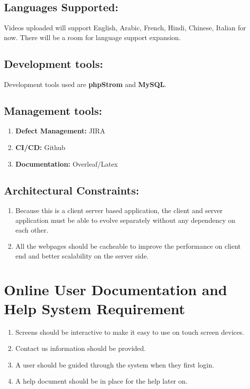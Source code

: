 \documentclass{report}
\begin{document}
\subsection{Languages Supported:}
Videos uploaded will support English, Arabic, French, Hindi, Chinese, Italian for now. There will be a room for language support expansion.
\subsection{Development tools:}
Development tools used are \textbf{phpStrom} and \textbf{MySQL}.
\subsection{Management tools:}
\begin{enumerate}
    \item \textbf{Defect Management:} JIRA
    \item \textbf{CI/CD:} Github
    \item \textbf{Documentation:} Overleaf/Latex
\end{enumerate}
\subsection{Architectural Constraints:}
\begin{enumerate}
    \item Because this is a client server based application, the client and server application must be able to evolve separately without any dependency on each other.
    \item All the webpages should be cacheable to improve the performance on client end and better scalability on the server side.
\end{enumerate}


\section{ Online User Documentation and Help System Requirement}
\begin{enumerate}
    \item Screens should be interactive to make it easy to use on touch screen devices.
    \item Contact us information should be provided.
    \item A user should be guided through the system when they first login.
    \item A help document should be in place for the help later on.
\end{enumerate}
\end{document}
